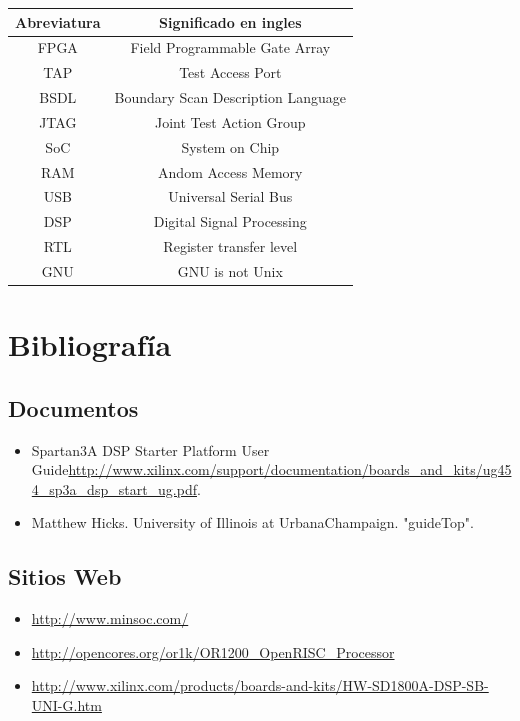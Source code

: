 \begin{table}[!h]
\begin{center}
\begin{tabular}{ c c }
\hline
\rowcolor[gray]{0.8} Abreviatura & Significado en ingles \\
\hline
FPGA & Field Programmable Gate Array  \\
\hline
TAP & Test Access Port  \\
\hline
BSDL & Boundary Scan Description Language  \\
\hline
JTAG & Joint Test Action Group  \\
\hline
SoC & System on Chip\\
\hline
RAM & Andom Access Memory \\
\hline
USB & Universal Serial Bus  \\
\hline
DSP& Digital Signal Processing \\
\hline
RTL & Register transfer level \\
\hline
GNU & GNU is not Unix\\
\hline
\end{tabular}
\end{center}
\end{table}

\newpage

\section{Bibliografía}
\subsection{Documentos}
\begin{itemize}
\item Spartan\-3A DSP Starter Platform User Guide\url{http://www.xilinx.com/support/documentation/boards_and_kits/ug454_sp3a_dsp_start_ug.pdf}.
\item Matthew Hicks. University of Illinois at Urbana\-Champaign. "guideTop".  
\end{itemize} 
\subsection{Sitios Web}
\begin{itemize}
\item \url{http://www.minsoc.com/}
\item \url{http://opencores.org/or1k/OR1200_OpenRISC_Processor}
\item\url{http://www.xilinx.com/products/boards-and-kits/HW-SD1800A-DSP-SB-UNI-G.htm}

\end{itemize} 


